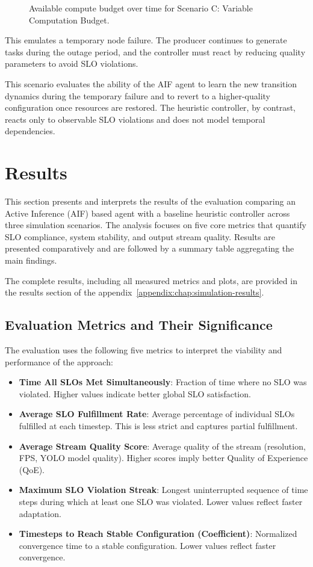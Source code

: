 \begin{figure}[htbp]
\centering

\caption{Available compute budget over time for Scenario C: Variable Computation Budget.}
\label{fig:eval-scenario-compute-budget}
\end{figure}


This emulates a temporary node failure. The producer continues to generate tasks during the outage period, and the controller must react by reducing quality parameters to avoid SLO violations.

This scenario evaluates the ability of the AIF agent to learn the new transition dynamics during the temporary failure and to revert to a higher-quality configuration once resources are restored. The heuristic controller, by contrast, reacts only to observable SLO violations and does not model temporal dependencies.

\section{Results}

This section presents and interprets the results of the evaluation comparing an Active Inference (AIF) based agent with a baseline heuristic controller across three simulation scenarios. The analysis focuses on five core metrics that quantify SLO compliance, system stability, and output stream quality. Results are presented comparatively and are followed by a summary table aggregating the main findings.

The complete results, including all measured metrics and plots, are provided in the results section of the appendix~\ref{appendix:chap:simulation-results}.

\subsection{Evaluation Metrics and Their Significance}

The evaluation uses the following five metrics to interpret the viability and performance of the approach:

\begin{itemize}
  \item \textbf{Time All SLOs Met Simultaneously}: Fraction of time where no SLO was violated. Higher values indicate better global SLO satisfaction.
  \item \textbf{Average SLO Fulfillment Rate}: Average percentage of individual SLOs fulfilled at each timestep. This is less strict and captures partial fulfillment.
  \item \textbf{Average Stream Quality Score}: Average quality of the stream (resolution, FPS, YOLO model quality). Higher scores imply better Quality of Experience (QoE).
  \item \textbf{Maximum SLO Violation Streak}: Longest uninterrupted sequence of time steps during which at least one SLO was violated. Lower values reflect faster adaptation.
  \item \textbf{Timesteps to Reach Stable Configuration (Coefficient)}: Normalized convergence time to a stable configuration. Lower values reflect faster convergence.
\end{itemize}

